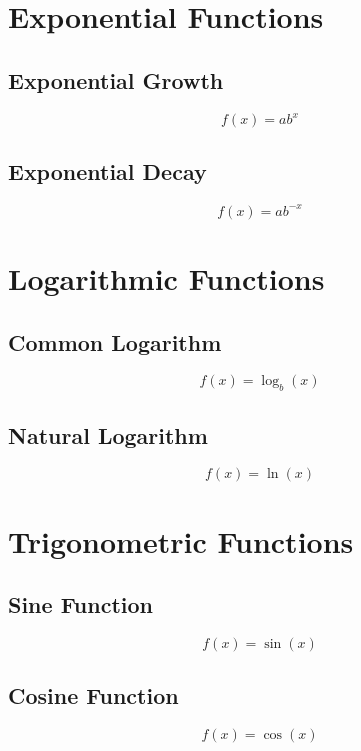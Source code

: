 \documentclass{book}
\begin{document}
\section{Exponential Functions}
\subsection{Exponential Growth}
\begin{equation}
    f(x) = ab^x
\end{equation}

\subsection{Exponential Decay}
\begin{equation}
    f(x) = ab^{-x}
\end{equation}

\section{Logarithmic Functions}
\subsection{Common Logarithm}
\begin{equation}
    f(x) = \log_b(x)
\end{equation}

\subsection{Natural Logarithm}
\begin{equation}
    f(x) = \ln(x)
\end{equation}

\section{Trigonometric Functions}
\subsection{Sine Function}
\begin{equation}
    f(x) = \sin(x)
\end{equation}

\subsection{Cosine Function}
\begin{equation}
    f(x) = \cos(x)
\end{equation}
\end{document}

